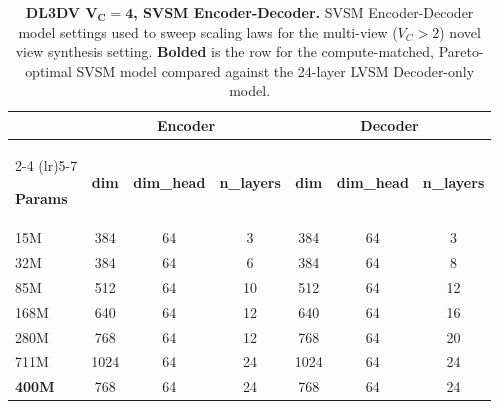 \begin{table}[t]
\centering
\begin{threeparttable}

\footnotesize            %
\setlength{\tabcolsep}{4pt}  %

\begin{tabular}{lcccccc}   %
\toprule

& \multicolumn{3}{c}{\textbf{Encoder}}
& \multicolumn{3}{c}{\textbf{Decoder}} \\
\cmidrule(lr){2-4} \cmidrule(lr){5-7}

\textbf{Params}
& \textbf{dim} & \textbf{dim\_head} & \textbf{n\_layers}
& \textbf{dim} & \textbf{dim\_head} & \textbf{n\_layers} \\
\midrule

15M & 384 & 64 & 3 & 384 & 64 & 3 \\
32M & 384 & 64 & 6 & 384 & 64 & 8 \\
85M & 512 & 64 & 10 & 512 & 64 & 12 \\
168M & 640 & 64 & 12 & 640 & 64 & 16 \\
280M & 768 & 64 & 12 & 768 & 64 & 20 \\
711M & 1024 & 64 & 24 & 1024 & 64 & 24 \\
\hline
\textbf{400M} & 768 & 64 & 24 & 768 & 64 & 24 \\

\bottomrule
\end{tabular}

\caption{\textbf{DL3DV $\boldsymbol{V_C}\mathbf{{=}4}$, SVSM Encoder-Decoder.} SVSM Encoder-Decoder model settings used to sweep scaling laws for the multi-view ($V_C > 2$) novel view synthesis setting. \textbf{Bolded} is the row for the compute-matched, Pareto-optimal SVSM model compared against the 24-layer LVSM Decoder-only model.}
\label{tab:svsm-dl3dv-details}
\end{threeparttable}
\end{table}

